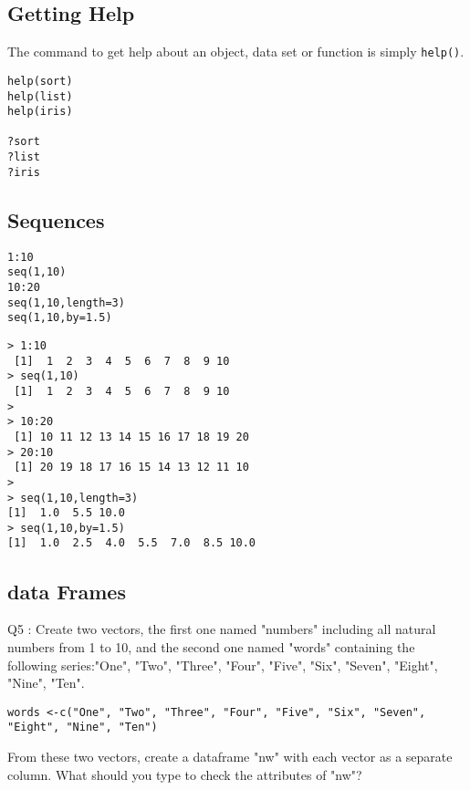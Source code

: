\documentclass[11pt]{article} %
\begin{document}
\subsection{Getting Help}
The command to get help about an object, data set or function is simply \texttt{help()}.

\begin{framed}
\begin{verbatim}
help(sort)
help(list)
help(iris)

?sort
?list
?iris
\end{verbatim}
\end{framed}
\subsection{Sequences}

\begin{framed}
\begin{verbatim}
1:10
seq(1,10)
10:20
seq(1,10,length=3)
seq(1,10,by=1.5)
\end{verbatim}
\end{framed}

\begin{verbatim}
> 1:10
 [1]  1  2  3  4  5  6  7  8  9 10
> seq(1,10)
 [1]  1  2  3  4  5  6  7  8  9 10
>
> 10:20
 [1] 10 11 12 13 14 15 16 17 18 19 20
> 20:10
 [1] 20 19 18 17 16 15 14 13 12 11 10
>
> seq(1,10,length=3)
[1]  1.0  5.5 10.0
> seq(1,10,by=1.5)
[1]  1.0  2.5  4.0  5.5  7.0  8.5 10.0
\end{verbatim}

\subsection{data Frames}
Q5 : Create two vectors, the first one named "numbers" including all natural numbers from 1 to 10, and the second one named "words" containing the following series:"One", "Two", "Three", "Four", "Five", "Six", "Seven", "Eight", "Nine", "Ten". 

\begin{framed}
\begin{verbatim}
words <-c("One", "Two", "Three", "Four", "Five", "Six", "Seven", "Eight", "Nine", "Ten")
\end{verbatim}
\end{framed}
From these two vectors, create a dataframe "nw" with each vector as a separate column. What should you type to check the attributes of "nw"?
\end{document}
